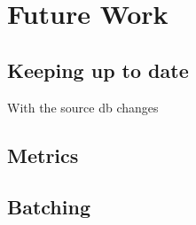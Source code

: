 \documentclass[a4paper]{book}
\begin{document}
    
      
    
    
    
    
    \chapter{Future Work}
        \section{Keeping up to date}
        With the source db changes
        \section{Metrics}
        \section{Batching}
    
      


    \nocite{*}
    \printbibliography{}
\end{document}
